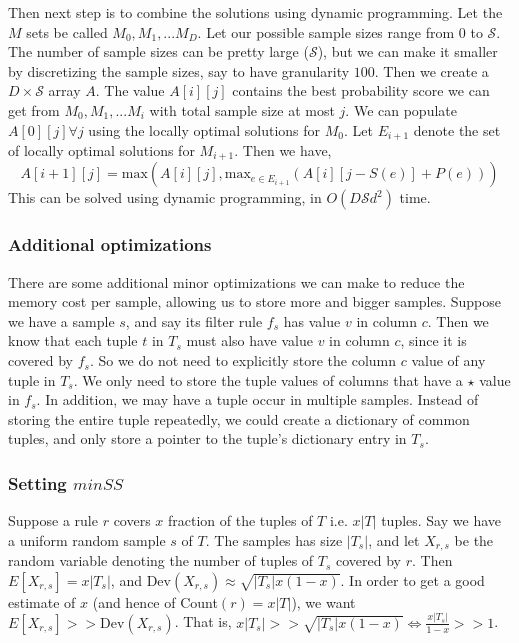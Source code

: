Then next step is to combine the solutions using dynamic programming. Let the $M$ sets be called $M_0, M_1, ... M_D$. Let our possible sample sizes range from $0$ to $\mathcal{S}$. The number of sample sizes can be pretty large ($\mathcal{S}$), but we can make it smaller by discretizing the sample sizes, say to have granularity $100$. Then we create a $D \times \mathcal{S}$ array $A$. The value $A\left[i\right]\left[j\right]$ contains the best probability score we can get from $M_0, M_1, ... M_i$ with total sample size at most $j$. We can populate $A\left[0\right]\left[j\right] \forall j$ using the locally optimal solutions for $M_0$. Let $E_{i+1}$ denote the set of locally optimal solutions for $M_{i+1}$. Then we have,
$$A\left[i+1\right] \left[j \right] = \textrm{max} (A\left[i\right]\left[j\right], \textrm{max}_{e \in E_{i+1}}(A\left[i\right]\left[j-S(e)\right] + P(e)))$$
This can be solved using dynamic programming, in $O(D\mathcal{S}d^2)$ time. 


\subsubsection{Additional optimizations}
There are some additional minor optimizations we can make to reduce the memory cost per sample, allowing us to store more and bigger samples. 
Suppose we have a sample $s$, and say its filter rule $f_s$ has value $v$ in column $c$. Then we know that each tuple $t$ in $T_s$ must also have value $v$ in column $c$, since it is covered by $f_s$. So we do not need to explicitly store the column $c$ value of any tuple in $T_s$. We only need to store the tuple values of columns that have a $\star$ value in $f_s$.
In addition, we may have a tuple occur in multiple samples. Instead of storing the entire tuple repeatedly, we could create a dictionary of common tuples, and only store a pointer to the tuple's dictionary entry in $T_s$. 

\subsubsection{Setting $minSS$}
Suppose a rule $r$ covers $x$ fraction of the tuples of $T$ i.e. $x|T|$ tuples. Say we have a uniform random sample $s$ of $T$. The samples has size $|T_s|$, and let $X_{r,s}$ be the random variable denoting the number of tuples of $T_s$ covered by $r$. Then $E\left[ X_{r,s} \right] = x|T_s|$, and $\text{Dev}(X_{r,s}) \approx \sqrt{|T_s|x(1-x)}$. In order to get a good estimate of $x$ (and hence of Count$(r) = x|T|$), we want $E\left[X_{r,s}\right] >> \text{Dev}(X_{r,s})$. That is, $x|T_s| >> \sqrt{|T_s|x(1-x)} \Leftrightarrow \frac{x|T_s|}{1-x} >> 1$. 

